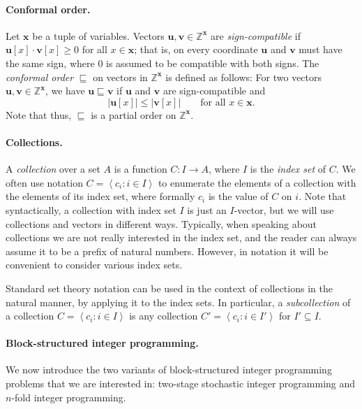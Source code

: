 \documentclass{theoretics}
\renewcommand{\leq}{\leqslant}
\renewcommand{\geq}{\geqslant}
\newcommand{\cfleq}{\sqsubseteq}
\newcommand{\Z}{\mathbb{Z}}
\newcommand{\tup}[1]{{\mathbf{#1}}}
\newcommand{\xx}{\tup x}
\newcommand{\uu}{\tup u}
\newcommand{\myvv}{\tup v} %
\newcommand{\mset}[1]{\left\langle #1\right\rangle}
\newcommand{\nfold}{$n$-fold}
\newcommand{\stage}{two-stage stochastic}
\begin{document}
\paragraph*{Conformal order.} Let $\xx$ be a tuple of variables. Vectors $\uu,\myvv\in \Z^{\xx}$ are {\em{sign-compatible}} if $\uu[x]\cdot \myvv[x]\geq 0$ for all $x\in \xx$; that is, on every coordinate $\uu$ and $\myvv$ must have the same sign, where $0$ is assumed to be compatible with both signs.
The {\em{conformal order}} $\cfleq$ on vectors in $\Z^{\xx}$ is defined as follows: For two vectors $\uu,\myvv\in \Z^{\xx}$, we have $\uu\cfleq \myvv$ if $\uu$ and $\myvv$ are sign-compatible and
$$|\uu[x]|\leq |\myvv[x]|\qquad \textrm{for all }x\in \xx.$$
Note that thus, $\cfleq$ is a partial order on $\Z^{\xx}$.

\paragraph*{Collections.} A {\em{collection}} over a set $A$ is a function $C\colon I\to A$, where $I$ is the {\em{index set}} of $C$.
We often use notation $C=\mset{c_i\colon i\in I}$ to enumerate the elements of a collection with the elements of its index set, where formally $c_i$ is the value of $C$ on $i$. Note that syntactically, a collection with index set $I$  is just an $I$-vector, but we will use collections and vectors in different ways. Typically, when speaking about collections we are not really interested in the index set, and the reader can always assume it to be a prefix of natural numbers. However, in notation it will be convenient to consider various index sets.

Standard set theory notation can be used in the context of  collections in the natural manner, by applying it to the index sets. In particular, a {\em{subcollection}} of a collection $C=\mset{c_i\colon i\in I}$ is any collection $C'=\mset{c_i\colon i\in I'}$ for $I'\subseteq I$.

\paragraph*{Block-structured integer programming.} We now introduce the two variants of block-structured integer programming problems that we are interested in: \stage{} integer programming and \nfold{} integer programming.
\end{document}
